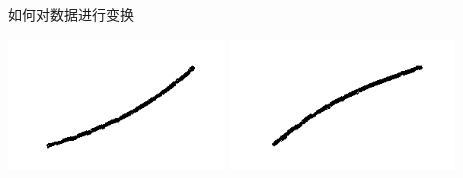 \documentclass[UTF8]{ctexbeamer}
\begin{document}
\begin{frame}{如何对数据进行变换}
\begin{figure}
  \end{figure}

  \begin{center}
    \includegraphics[height=.1\textheight{}]{down.png}
    \includegraphics[height=.1\textheight{}]{up.png}
  \end{center}
  
\end{frame}
\end{document}
